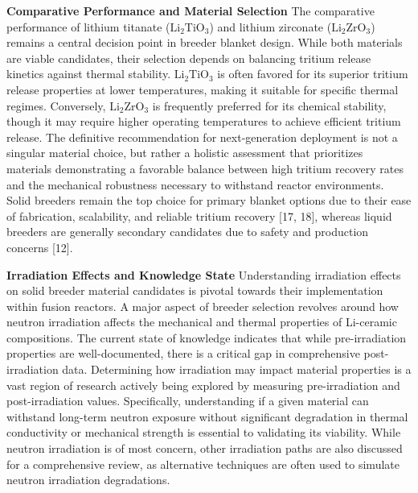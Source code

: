 \documentclass[review,12pt,a4paper]{elsarticle}
\begin{document}
\textbf{Comparative Performance and Material Selection}
\textcolor{highconf}{The comparative performance of lithium titanate ($\mathrm{Li}_2\mathrm{TiO}_3$) and lithium zirconate ($\mathrm{Li}_2\mathrm{ZrO}_3$) remains a central decision point in breeder blanket design. While both materials are viable candidates, their selection depends on balancing tritium release kinetics against thermal stability. $\mathrm{Li}_2\mathrm{TiO}_3$ is often favored for its superior tritium release properties at lower temperatures, making it suitable for specific thermal regimes. Conversely, $\mathrm{Li}_2\mathrm{ZrO}_3$ is frequently preferred for its chemical stability, though it may require higher operating temperatures to achieve efficient tritium release. The definitive recommendation for next-generation deployment is not a singular material choice, but rather a holistic assessment that prioritizes materials demonstrating a favorable balance between high tritium recovery rates and the mechanical robustness necessary to withstand reactor environments. Solid breeders remain the top choice for primary blanket options due to their ease of fabrication, scalability, and reliable tritium recovery [17, 18], whereas liquid breeders are generally secondary candidates due to safety and production concerns [12].}

\textbf{Irradiation Effects and Knowledge State}
\textcolor{highconf}{Understanding irradiation effects on solid breeder material candidates is pivotal towards their implementation within fusion reactors. A major aspect of breeder selection revolves around how neutron irradiation affects the mechanical and thermal properties of Li-ceramic compositions. The current state of knowledge indicates that while pre-irradiation properties are well-documented, there is a critical gap in comprehensive post-irradiation data. Determining how irradiation may impact material properties is a vast region of research actively being explored by measuring pre-irradiation and post-irradiation values. Specifically, understanding if a given material can withstand long-term neutron exposure without significant degradation in thermal conductivity or mechanical strength is essential to validating its viability. While neutron irradiation is of most concern, other irradiation paths are also discussed for a comprehensive review, as alternative techniques are often used to simulate neutron irradiation degradations.}
\end{document}
